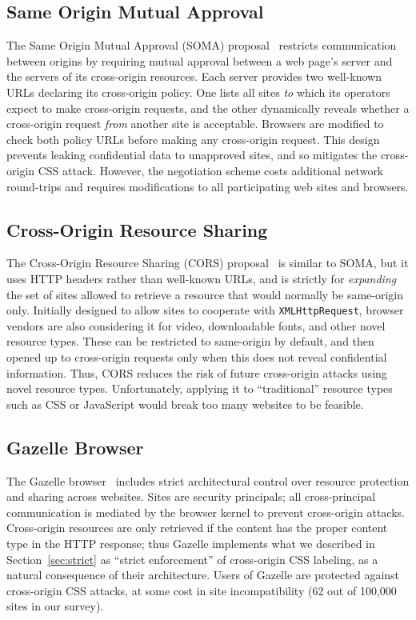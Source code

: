 \documentclass{sig-alternate}
\begin{document}
\subsection{Same Origin Mutual Approval}
The Same Origin Mutual Approval (SOMA) proposal~\cite{soma} restricts
communication between origins by requiring mutual approval between a
web page's server and the servers of its cross-origin resources.  Each
server provides two well-known URLs declaring its cross-origin policy.
One lists all sites \emph{to} which its operators expect to make
cross-origin requests, and the other dynamically reveals whether a
cross-origin request \emph{from} another site is acceptable.  Browsers
are modified to check both policy URLs before making any cross-origin
request.  This design prevents leaking confidential data to unapproved
sites, and so mitigates the cross-origin CSS attack. However, the
negotiation scheme costs additional network round-trips and requires
modifications to all participating web sites and browsers.

\subsection{Cross-Origin Resource Sharing}
The Cross-Origin Resource Sharing (CORS) proposal~\cite{cors} is
similar to SOMA, but it uses HTTP headers rather than well-known URLs,
and is strictly for \emph{expanding} the set of sites allowed to
retrieve a resource that would normally be same-origin only.
Initially designed to allow sites to cooperate with
\texttt{XMLHttpRequest}, browser vendors are also considering it for
video, downloadable fonts, and other novel resource types.  These can
be restricted to same-origin by default, and then opened up to
cross-origin requests only when this does not reveal confidential
information.  Thus, CORS reduces the risk of future cross-origin
attacks using novel resource types.  Unfortunately, applying it to
“traditional” resource types such as CSS or JavaScript would break too
many websites to be feasible.

\subsection{Gazelle Browser}
The Gazelle browser~\cite{gazelle} includes strict architectural
control over resource protection and sharing across websites.  Sites
are security principals; all cross-principal communication is mediated
by the browser kernel to prevent cross-origin attacks.  Cross-origin
resources are only retrieved if the content has the proper content
type in the HTTP response; thus Gazelle implements what we described
in Section~\ref{sec:strict} as “strict enforcement” of cross-origin
CSS labeling, as a natural consequence of their architecture.  Users
of Gazelle are protected against cross-origin CSS attacks, at some
cost in site incompatibility (62 out of 100,000 sites in our survey).
\end{document}
